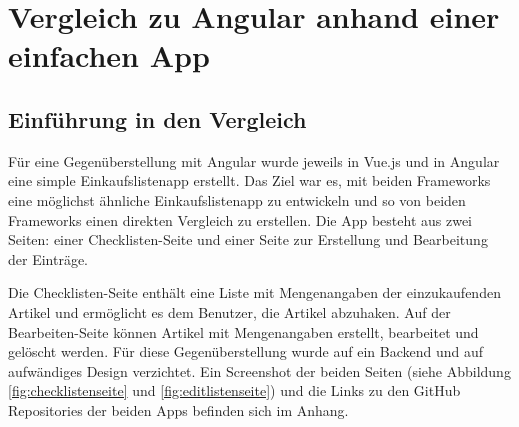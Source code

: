 

\chapter{Vergleich zu Angular anhand einer einfachen App}\label{ch:vergleich-zu-angular-anhand-einer-einfachen-app}


\section{Einführung in den Vergleich}
Für eine Gegenüberstellung mit Angular wurde jeweils in Vue.js und in Angular eine
simple Einkaufslistenapp erstellt.
Das Ziel war es, mit beiden Frameworks eine möglichst ähnliche Einkaufslistenapp zu entwickeln und
so von beiden Frameworks einen direkten Vergleich zu erstellen.
Die App besteht aus zwei Seiten: einer Checklisten-Seite und einer Seite zur Erstellung und Bearbeitung der Einträge.

Die Checklisten-Seite enthält eine Liste mit Mengenangaben der einzukaufenden Artikel und ermöglicht es dem Benutzer, die Artikel abzuhaken.
Auf der Bearbeiten-Seite können Artikel mit Mengenangaben erstellt, bearbeitet und gelöscht werden.
Für diese Gegenüberstellung wurde auf ein Backend und auf aufwändiges Design verzichtet.
Ein Screenshot der beiden Seiten (siehe Abbildung \ref{fig:checklistenseite} und \ref{fig:editlistenseite}) und die Links zu den GitHub Repositories der beiden Apps befinden sich im Anhang.


